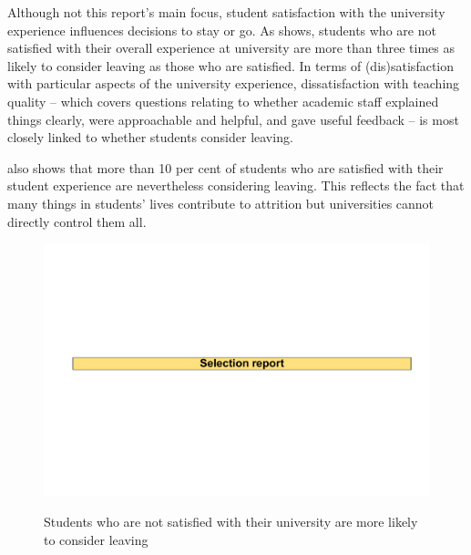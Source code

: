Although not this report's main focus, student satisfaction with the university experience influences decisions to stay or go. As  shows, students who are not satisfied with their overall experience at university are more than three times as likely to consider leaving as those who are satisfied. In terms of (dis)satisfaction with particular aspects of the university experience, dissatisfaction with teaching quality -- which covers questions relating to whether academic staff explained things clearly, were approachable and helpful, and gave useful feedback -- is most closely linked to whether students consider leaving.

 also shows that more than 10 per cent of students who are satisfied with their student experience are nevertheless considering leaving. This reflects the fact that many things in students' lives contribute to attrition but universities cannot directly control them all.


                \begin{figure}[t]
                    \caption{Students who are not satisfied with their university are more likely to consider leaving\label{fig:24}}%
                    \includegraphics[page=32]{atlas/selection_chartdeck.pdf} 
                    {\textcite{SocialResearchCentre/DepartmentofEducationandTraining}}
                \end{figure}

